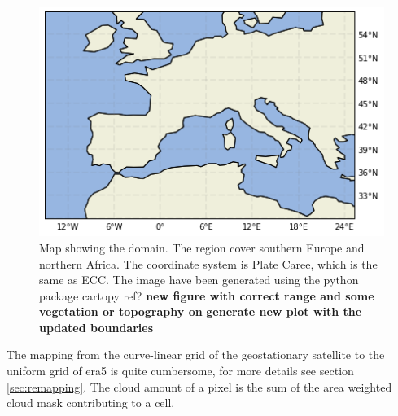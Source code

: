 \begin{figure}[h]
    \centering
    \includegraphics[scale = 0.7]{Chapter2_Theory/images/Domain.png}
    \caption{Map showing the domain. The region cover southern Europe and northern Africa. The coordinate system is Plate Caree, which is the same as ECC. The image have been generated using the python package cartopy ref? \textbf{new figure with correct range and some vegetation or topography on  } \textbf{generate new plot with the updated boundaries}}
    \label{fig:map}
\end{figure}
The mapping from the curve-linear grid of the geostationary satellite to the uniform grid of era5 is quite cumbersome, for more details see section \ref{sec:remapping}. The cloud amount of a pixel is the sum of the area weighted cloud mask contributing to a cell.


